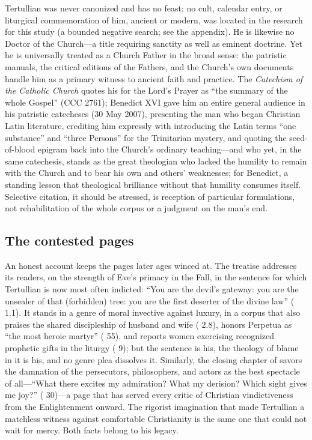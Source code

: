 Tertullian was never canonized and has no feast; no cult, calendar entry, or
liturgical commemoration of him, ancient or modern, was located in the
research for this study (a bounded negative search; see the appendix). He is likewise no
Doctor of the Church---a title requiring sanctity as well as eminent doctrine.
Yet he is universally treated as a Church Father in the broad sense: the
patristic manuals, the critical editions of the Fathers, and the Church's own
documents handle him as a primary witness to ancient faith and practice. The
\textit{Catechism of the Catholic Church} quotes his  for the
Lord's Prayer as ``the summary of the whole Gospel'' (CCC 2761); Benedict XVI
gave him an entire general audience in his patristic catecheses (30 May 2007),
presenting the man who began Christian Latin literature, crediting him
expressly with introducing the Latin terms ``one substance'' and ``three
Persons'' for the Trinitarian mystery, and quoting the seed-of-blood epigram
back into the Church's ordinary teaching---and who yet, in the same
catechesis, stands as the great theologian who lacked the humility to remain
with the Church and to bear his own and others' weaknesses; for Benedict, a
standing lesson that theological brilliance without that humility consumes
itself. Selective citation, it
should be stressed, is reception of particular formulations, not
rehabilitation of the whole corpus or a judgment on the man's end.

\subsection{The contested pages}

An honest account keeps the pages later ages winced at. The treatise  addresses its readers, on the strength of Eve's
primacy in the Fall, in the sentence for which Tertullian is now most often
indicted: ``You are the devil's gateway: you are the unsealer of that
(forbidden) tree: you are the first deserter of the divine law'' ( 1.1). It stands in a genre of moral invective against luxury,
in a corpus that also praises the shared discipleship of husband and wife
( 2.8), honors Perpetua as ``the most heroic martyr''
( 55), and reports women exercising recognized prophetic
gifts in the liturgy ( 9); but the sentence is his, the
theology of blame in it is his, and no genre plea dissolves it. Similarly, the
closing chapter of  savors the damnation of the persecutors,
philosophers, and actors as the best spectacle of all---``What there excites my
admiration? What my derision? Which sight gives me joy?'' (
30)---a page that has served every critic of Christian vindictiveness from the
Enlightenment onward. The rigorist imagination that made Tertullian a matchless
witness against comfortable Christianity is the same one that could not wait
for mercy. Both facts belong to his legacy.

